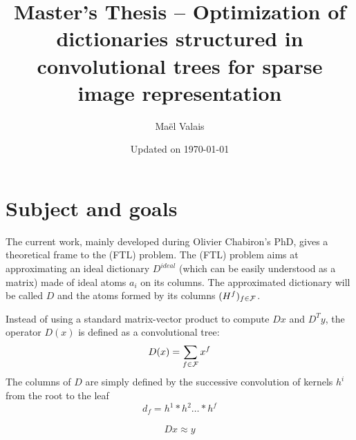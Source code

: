 \author{Maël Valais}
\date{Updated on \today}
\title{Master's Thesis – Optimization of dictionaries structured in convolutional trees for sparse image representation}


\section{Subject and goals}

The current work, mainly developed during Olivier Chabiron's PhD, gives a theoretical frame to the (FTL) problem. The (FTL) problem aims at approximating an ideal dictionary $D^{ideal}$ (which can be easily understood as a matrix) made of ideal atoms $a_i$ on its columns. The approximated dictionary will be called $D$ and the atoms formed by its columns $(H^f)_{f \in \mathcal F}$. 

Instead of using a standard matrix-vector product to compute $Dx$ and $D^Ty$, the operator $D(x)$ is defined as a convolutional tree:
$$D(x) = \sum_{f\in\mathcal F} x^f$$
The columns of $D$ are simply defined by the successive convolution of kernels $h^i$ from the root to the leaf
$$d_f = h^1 * h^2 \dots * h^f$$



\begin{equation*} \begin{aligned}
Dx \approx y
\end{aligned} \end{equation*}


